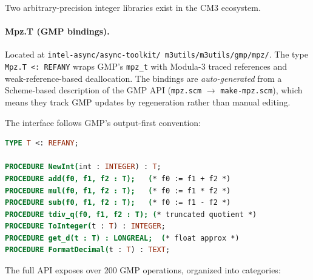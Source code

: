 \documentclass[12pt]{report}
\begin{document}
Two arbitrary-precision integer libraries exist in the CM3 ecosystem.

\paragraph{Mpz.T (GMP bindings).}
Located at {\tt intel-async/\allowbreak async-toolkit/\allowbreak
m3utils/\allowbreak m3utils/\allowbreak gmp/\allowbreak mpz/}.  The type
{\tt Mpz.T <: REFANY} wraps GMP's {\tt mpz\_t} with Modula-3 traced
references and weak-reference-based deallocation.  The bindings are
\emph{auto-generated} from a Scheme-based description of the GMP API
({\tt mpz.scm} $\to$ {\tt make-mpz.scm}), which means they track GMP
updates by regeneration rather than manual editing.

The interface follows GMP's output-first convention:

\begin{lstlisting}[language=Modula3]
TYPE T <: REFANY;

PROCEDURE NewInt(int : INTEGER) : T;
PROCEDURE add(f0, f1, f2 : T);   (* f0 := f1 + f2 *)
PROCEDURE mul(f0, f1, f2 : T);   (* f0 := f1 * f2 *)
PROCEDURE sub(f0, f1, f2 : T);   (* f0 := f1 - f2 *)
PROCEDURE tdiv_q(f0, f1, f2 : T); (* truncated quotient *)
PROCEDURE ToInteger(t : T) : INTEGER;
PROCEDURE get_d(t : T) : LONGREAL;  (* float approx *)
PROCEDURE FormatDecimal(t : T) : TEXT;
\end{lstlisting}

\noindent The full API exposes over 200 GMP operations, organized
into categories:
\end{document}
